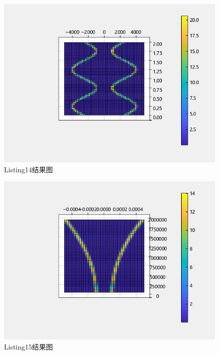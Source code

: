 \documentclass{article}
\begin{document}
	
	\begin{figure}[htbp]
		\centering
		\includegraphics{hw5(14).jpeg}
		\caption{Listing14结果图}
		\label{fig14}
	\end{figure}
	
	\begin{figure}[htbp]
		\centering
		\includegraphics{hw5(15).jpeg}
		\caption{Listing15结果图}
		\label{fig15}
	\end{figure}
	
\end{document}
